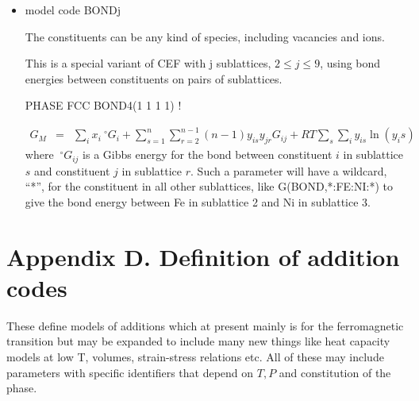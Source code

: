 \documentclass[12pt]{article}
\begin{document}
\begin{itemize}
\item model code BONDj

  The constituents can be any kind of species, including vacancies and
  ions.

  This is a special variant of CEF with j sublattices, $2\leq j \leq
  9$, using bond energies between constituents on pairs of
  sublattices.

  PHASE FCC BOND4(1 1 1 1) !

  \begin{eqnarray}
    G_M &=& \sum_i x_i ~^{\circ}G_i + \sum_{s=1}^n \sum_{r=2}^{n-1} (n-1) y_{is} y_{jr}G_{ij}+RT\sum_s \sum_i y_{is}\ln(y_is)
  \end{eqnarray}
  where $~^{\circ}G_{ij}$ is a Gibbs energy for the bond between
  constituent $i$ in sublattice $s$ and constituent $j$ in sublattice
  $r$.  Such a parameter will have a wildcard, ``*'', for the
  constituent in all other sublattices, like G(BOND,*:FE:NI:*) to give
  the bond energy between Fe in sublattice 2 and Ni in sublattice 3.
\end{itemize}

\newpage

\section{Appendix D.  Definition of addition codes}

These define models of additions which at present mainly is for the
ferromagnetic transition but may be expanded to include many new
things like heat capacity models at low T, volumes, strain-stress
relations etc.  All of these may include parameters with specific
identifiers that depend on $T, P$ and constitution of the phase.
\end{document}
